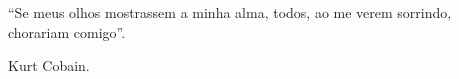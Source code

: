 \begin{epigrafe}
``Se meus olhos mostrassem a minha alma, todos, ao me verem sorrindo, chorariam comigo''.

\hfill Kurt Cobain.
\end{epigrafe}
